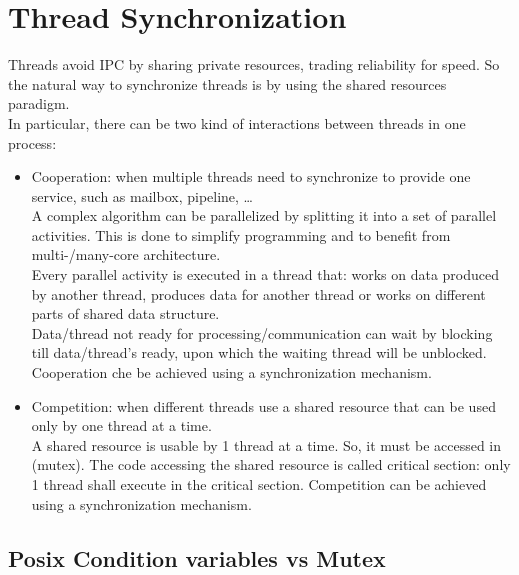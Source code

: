 \section{Thread Synchronization}
Threads avoid IPC by sharing private resources, trading reliability for speed. So the natural way to synchronize threads is by using the shared resources paradigm.\\
In particular, there can be two kind of interactions between threads in one process:
\begin{itemize}
    \item Cooperation: when multiple threads need to synchronize to provide one service, such as mailbox, pipeline, \dots\\
    A complex algorithm can be parallelized by splitting it into a set of parallel activities. This is done to simplify programming and to benefit from multi-/many-core architecture.\\
    Every parallel activity is executed in a thread that: works on data produced by another thread, produces data for another thread or works on different parts of shared data structure.\\
    Data/thread not ready for processing/communication can wait by blocking till data/thread's ready, upon which the waiting thread will be unblocked. Cooperation che be achieved using a synchronization mechanism.
    \item Competition: when different threads use a shared resource that can be used only by one thread at a time.\\
    A shared resource is usable by 1 thread at a time. So, it must be accessed in  (mutex). The code accessing the shared resource is called critical section: only 1 thread shall execute in the critical section. Competition can be achieved using a synchronization mechanism. 
\end{itemize}


\subsection{Posix Condition variables vs Mutex}

